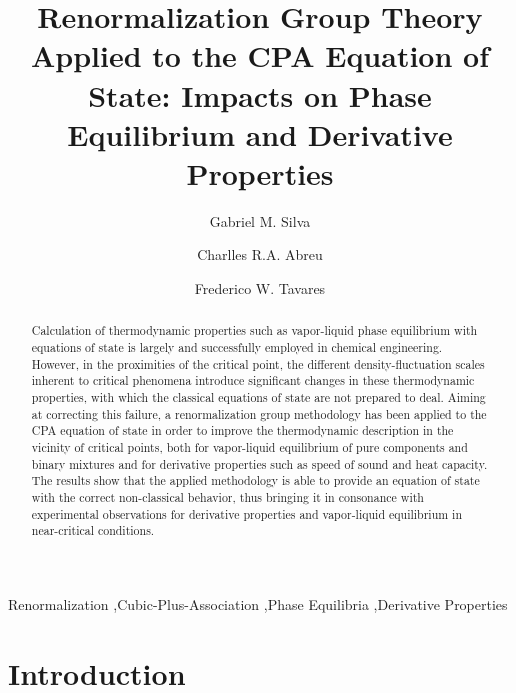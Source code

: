 \documentclass[preprint,12pt,3p]{elsarticle}
\date{\vspace{-5ex}}
\begin{document}
\begin{frontmatter}

\title{Renormalization Group Theory Applied to the CPA Equation of State: Impacts on Phase Equilibrium and Derivative Properties}


\author[1]{Gabriel M. Silva}
\author[1]{Charlles R.A. Abreu}
\author[1,2]{Frederico W. Tavares}
\address[1]{Escola de Química, Universidade Federal do Rio de Janeiro, Rio de Janeiro C.P. 68542, Brazil}
\address[2]{Programa de Engenharia Química – COPPE, Universidade Federal do Rio de Janeiro, Rio de Janeiro, C.P. 68542, Brazil}

\begin{abstract}
    Calculation of thermodynamic properties such as vapor-liquid phase equilibrium with equations of state is largely and successfully employed in chemical engineering. However, in the proximities of the critical point, the different density-fluctuation scales inherent to critical phenomena introduce significant changes in these thermodynamic properties, with which the classical equations of state are not prepared to deal. Aiming at correcting this failure, a renormalization group methodology has been applied to the CPA equation of state in order to improve the thermodynamic description in the vicinity of critical points, both for vapor-liquid equilibrium of pure components and binary mixtures and for derivative properties such as speed of sound and heat capacity. The results show that the applied methodology is able to provide an equation of state with the correct non-classical behavior, thus bringing it in consonance with experimental observations for derivative properties and vapor-liquid equilibrium in near-critical conditions.
\end{abstract}

\begin{keyword}
Renormalization \sep Cubic-Plus-Association \sep Phase Equilibria \sep Derivative Properties
\end{keyword}

\end{frontmatter}

\linenumbers

\renewcommand{\thesection}{\arabic{section}}
\section{Introduction}
\end{document}
